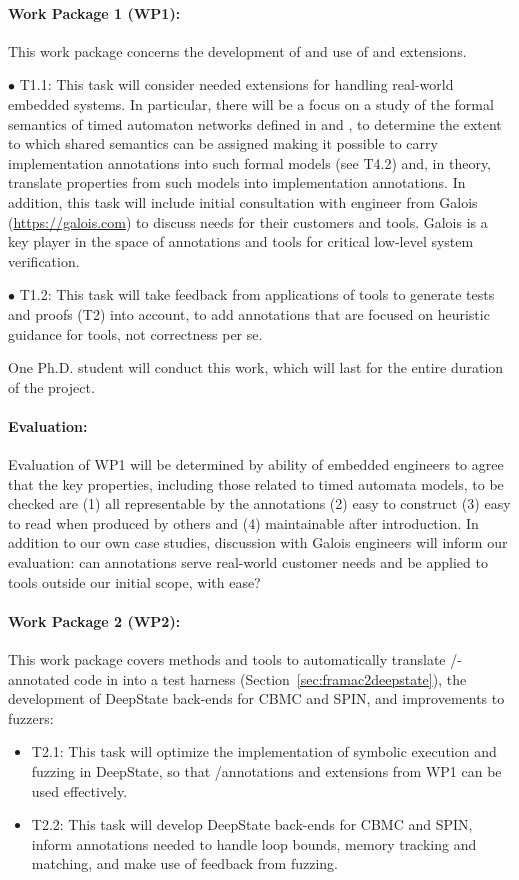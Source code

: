 \paragraph{Work Package 1 (WP1):}  This work package concerns the
development of and use of \acsl and \eacsl extensions.


$\bullet$ T1.1: This task will consider needed extensions for handling
real-world embedded systems.  In particular, there will be a focus on
a study of the formal semantics of timed
automaton networks defined in \uppaal and \prism, to determine the
extent to which shared semantics can be assigned making it possible to
carry implementation annotations into such formal models (see T4.2)
and, in theory, translate properties from such models into
implementation annotations.  In addition, this task will include
initial consultation with engineer from Galois
(\url{https://galois.com}) to discuss needs for their customers and
tools.  Galois is a key player in the space of annotations and tools
for critical low-level system verification.

$\bullet$ T1.2: This task will take feedback from applications of
tools to generate tests and proofs (T2) into account, to add annotations
that are focused on heuristic guidance for tools, not correctness per se.

One Ph.D. student will conduct this work, which will last for the entire duration of the project.

\paragraph{Evaluation:} Evaluation of
WP1 will be determined by ability of embedded engineers to agree that
the key properties, including those related to timed automata models, to be checked are (1) all representable by the
annotations (2) easy to construct (3) easy to read when produced by others and
(4) maintainable after introduction.  In addition to our own case
studies, discussion with Galois engineers will inform our evaluation:
can annotations serve real-world customer needs and be applied to
tools outside our initial scope, with ease?

\paragraph{Work Package 2 (WP2):}  This work package covers
methods and tools to automatically translate \acsl/\eacsl-annotated code in
into a \deepstate test harness (Section~\ref{sec:framac2deepstate}),
the development of DeepState back-ends for CBMC and SPIN, and
improvements to fuzzers:
\begin{itemize}[labelsep=3pt,leftmargin=12pt]
\item T2.1: This task will optimize the implementation of symbolic
  execution and fuzzing in DeepState, so that \acsl/\eacsl annotations
  and extensions from WP1 can be used effectively.
\item T2.2: This task will develop DeepState back-ends for CBMC and
  SPIN, inform annotations needed to handle loop bounds,
  memory tracking and matching, and make use of feedback from fuzzing.
\end{itemize}

